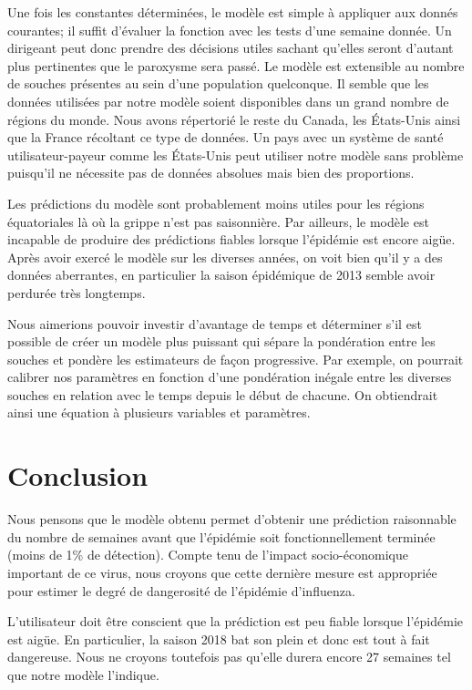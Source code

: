 \documentclass[12pt]{article}
\begin{document}
Une fois les constantes d\'etermin\'ees, le mod\`ele est simple \`a appliquer aux donn\'es
courantes; il suffit d'\'evaluer la fonction avec les tests d'une semaine donn\'ee. Un dirigeant
peut donc prendre des d\'ecisions utiles sachant qu'elles seront d'autant plus pertinentes que le
paroxysme sera pass\'e. Le mod\`ele est extensible au nombre de souches pr\'esentes au sein d'une
population quelconque. Il semble que les donn\'ees utilis\'ees par notre mod\`ele soient disponibles
dans un grand nombre de r\'egions du monde. Nous avons r\'epertori\'e le reste du
Canada\cite{InfluenzaCAN}, les \'Etats-Unis\cite{InfluenzaUSA} ainsi que la France\cite{InfluenzaFRA}
r\'ecoltant ce type de donn\'ees. Un pays avec un syst\`eme de sant\'e utilisateur-payeur comme les
\'Etats-Unis peut utiliser notre mod\`ele sans probl\`eme puisqu'il ne n\'ecessite pas de donn\'ees
absolues mais bien des proportions.

Les pr\'edictions du mod\`ele sont probablement moins utiles pour les r\'egions \'equatoriales l\`a
o\`u la grippe n'est pas saisonni\`ere. Par ailleurs, le mod\`ele est incapable de produire des
pr\'edictions fiables lorsque l'\'epid\'emie est encore aig\"ue. Apr\`es avoir exerc\'e le mod\`ele
sur les diverses ann\'ees, on voit bien qu'il y a des donn\'ees aberrantes, en particulier la saison
\'epid\'emique de 2013 semble avoir perdur\'ee tr\`es longtemps.

Nous aimerions pouvoir investir d'avantage de temps et d\'eterminer s'il est possible de cr\'eer
un mod\`ele plus puissant qui s\'epare la pond\'eration entre les souches et pond\`ere les
estimateurs de fa\c con progressive. Par exemple, on pourrait calibrer nos param\`etres en fonction
d'une pond\'eration in\'egale entre les diverses souches en relation avec le temps depuis le d\'ebut
de chacune. On obtiendrait ainsi une \'equation \`a plusieurs variables et param\`etres.

\section{Conclusion}
Nous pensons que le mod\`ele obtenu permet d'obtenir une pr\'ediction raisonnable du nombre de
semaines avant que l'\'epid\'emie soit fonctionnellement termin\'ee (moins de 1\% de d\'etection).
Compte tenu de l'impact socio-\'economique important de ce virus, nous croyons que cette derni\`ere
mesure est appropri\'ee pour estimer le degr\'e de dangerosit\'e de l'\'epid\'emie d'influenza.

L'utilisateur doit \^etre conscient que la pr\'ediction est peu fiable lorsque l'\'epid\'emie est
aig\"ue. En particulier, la saison 2018 bat son plein et donc est tout \`a fait dangereuse. Nous ne
croyons toutefois pas qu'elle durera encore 27 semaines tel que notre mod\`ele l'indique.
\clearpage
\end{document}
